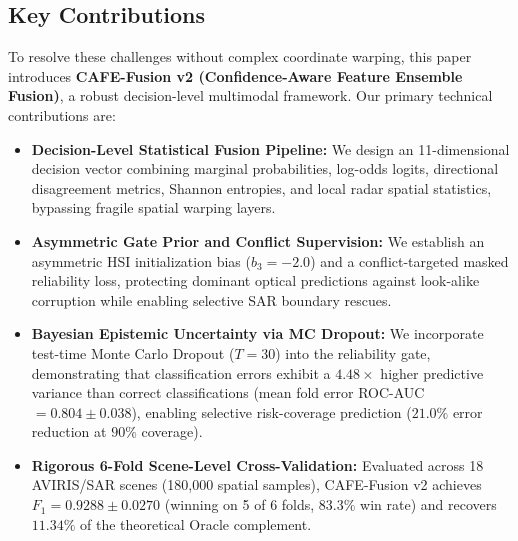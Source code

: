 \documentclass[conference]{IEEEtran}
\begin{document}
\subsection{Key Contributions}
To resolve these challenges without complex coordinate warping, this paper introduces \textbf{CAFE-Fusion v2 (Confidence-Aware Feature Ensemble Fusion)}, a robust decision-level multimodal framework. Our primary technical contributions are:
\begin{itemize}
    \item \textbf{Decision-Level Statistical Fusion Pipeline:} We design an 11-dimensional decision vector combining marginal probabilities, log-odds logits, directional disagreement metrics, Shannon entropies, and local radar spatial statistics, bypassing fragile spatial warping layers.
    
    \item \textbf{Asymmetric Gate Prior and Conflict Supervision:} We establish an asymmetric HSI initialization bias ($b_3 = -2.0$) and a conflict-targeted masked reliability loss, protecting dominant optical predictions against look-alike corruption while enabling selective SAR boundary rescues.
    
    \item \textbf{Bayesian Epistemic Uncertainty via MC Dropout:} We incorporate test-time Monte Carlo Dropout ($T=30$) into the reliability gate, demonstrating that classification errors exhibit a $4.48\times$ higher predictive variance than correct classifications (mean fold error ROC-AUC $= 0.804 \pm 0.038$), enabling selective risk-coverage prediction ($21.0\%$ error reduction at $90\%$ coverage).
    
    \item \textbf{Rigorous 6-Fold Scene-Level Cross-Validation:} Evaluated across 18 AVIRIS/SAR scenes (180,000 spatial samples), CAFE-Fusion v2 achieves $F_1 = 0.9288 \pm 0.0270$ (winning on 5 of 6 folds, $83.3\%$ win rate) and recovers $11.34\%$ of the theoretical Oracle complement.
\end{itemize}
\end{document}
